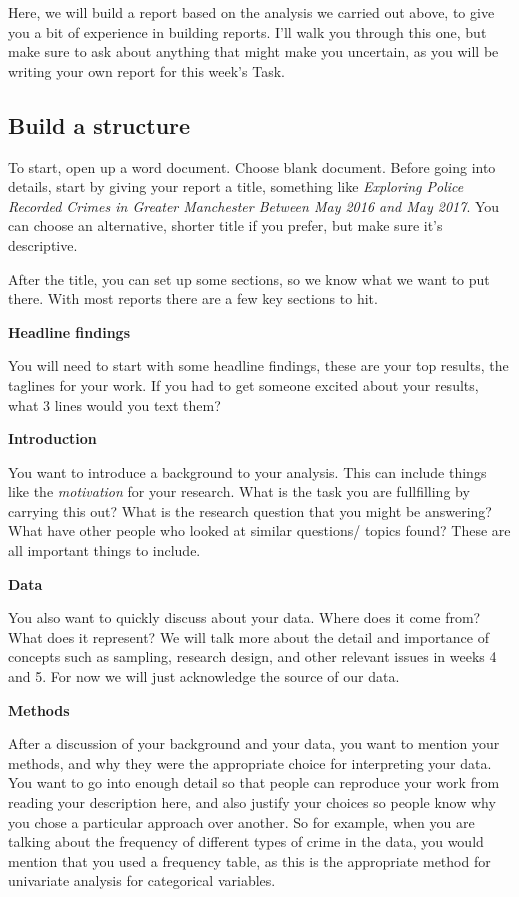 \documentclass[]{book}
\theoremstyle{definition}
\theoremstyle{definition}
\theoremstyle{definition}
\theoremstyle{remark}
\begin{document}
Here, we will build a report based on the analysis we carried out above,
to give you a bit of experience in building reports. I'll walk you
through this one, but make sure to ask about anything that might make
you uncertain, as you will be writing your own report for this week's
Task.

\hypertarget{build-a-structure}{%
\subsection{Build a structure}\label{build-a-structure}}

To start, open up a word document. Choose blank document. Before going
into details, start by giving your report a title, something like
\emph{Exploring Police Recorded Crimes in Greater Manchester Between May
2016 and May 2017}. You can choose an alternative, shorter title if you
prefer, but make sure it's descriptive.

After the title, you can set up some sections, so we know what we want
to put there. With most reports there are a few key sections to hit.

\textbf{Headline findings}

You will need to start with some headline findings, these are your top
results, the taglines for your work. If you had to get someone excited
about your results, what 3 lines would you text them?

\textbf{Introduction}

You want to introduce a background to your analysis. This can include
things like the \emph{motivation} for your research. What is the task
you are fullfilling by carrying this out? What is the research question
that you might be answering? What have other people who looked at
similar questions/ topics found? These are all important things to
include.

\textbf{Data}

You also want to quickly discuss about your data. Where does it come
from? What does it represent? We will talk more about the detail and
importance of concepts such as sampling, research design, and other
relevant issues in weeks 4 and 5. For now we will just acknowledge the
source of our data.

\textbf{Methods}

After a discussion of your background and your data, you want to mention
your methods, and why they were the appropriate choice for interpreting
your data. You want to go into enough detail so that people can
reproduce your work from reading your description here, and also justify
your choices so people know why you chose a particular approach over
another. So for example, when you are talking about the frequency of
different types of crime in the data, you would mention that you used a
frequency table, as this is the appropriate method for univariate
analysis for categorical variables.
\end{document}
